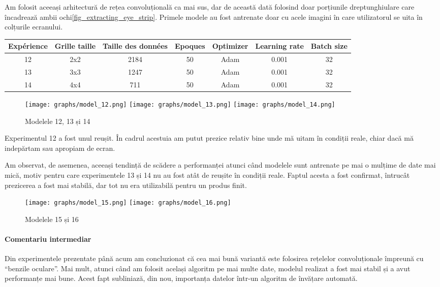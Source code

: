 Am folosit aceeași arhitectură de rețea convoluțională ca mai sus, dar de această dată folosind doar porțiunile dreptunghiulare care încadrează ambii ochi\ref{fig_extracting_eye_strip}.
Primele modele au fost antrenate doar cu acele imagini în care utilizatorul se uita în colțurile ecranului.

\begin{center}
    \begin{tabular}{ c | c | c | c | c | c | c }
        \hline
        Expérience & Grille taille & Taille des données & Epoques & Optimizer & Learning rate & Batch size \\ 
        \hline
        12 & 2x2 & 2184 & 50 & Adam & 0.001 & 32 \\
        \hline
        13 & 3x3 & 1247 & 50 & Adam & 0.001 & 32 \\
        \hline
        14 & 4x4 & 711 & 50 & Adam & 0.001 & 32 \\
        \hline
    \end{tabular}
\end{center}

\begin{figure}
    \centering
    \texttt{[image: graphs/model\_12.png]}
    \texttt{[image: graphs/model\_13.png]}
    \texttt{[image: graphs/model\_14.png]}
    \caption{Modelele 12, 13 și 14}
\end{figure}


Experimentul 12 a fost unul reușit.
În cadrul acestuia am putut prezice relativ bine unde mă uitam în condiții reale, chiar dacă mă indepărtam sau apropiam de ecran.


Am observat, de asemenea, aceeași tendință de scădere a performanței atunci când modelele sunt antrenate pe mai o mulțime de date mai mică, motiv pentru care experimentele 13 și 14 nu au fost atât de reușite în condiții reale.
Faptul acesta a fost confirmat, întrucât prezicerea a fost mai stabilă, dar tot nu era utilizabilă pentru un produs finit.

\begin{figure}
    \centering
    \texttt{[image: graphs/model\_15.png]}
    \texttt{[image: graphs/model\_16.png]}
    \caption{Modelele 15 și 16}
\end{figure}

\paragraph{Comentariu intermediar}
Din experimentele prezentate până acum am concluzionat că cea mai bună variantă este folosirea rețelelor convoluționale împreună cu ``benzile oculare''.
Mai mult, atunci când am folosit același algoritm pe mai multe date, modelul realizat a fost mai stabil și a avut performanțe mai bune.
Acest fapt subliniază, din nou, importanța datelor într-un algoritm de învățare automată.

